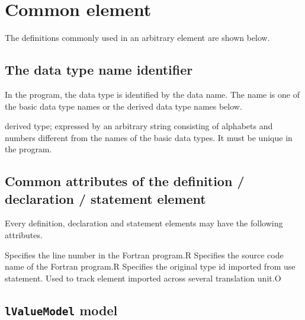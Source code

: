 \section{Common element}

The definitions commonly used in an arbitrary element are shown below.

\subsection{The data type name identifier}
\label{sec:Thedatatypenameidentifier}

In the program, the data type is identified by the data name.
The name is one of the basic data type names or the derived data type names below.
\newline

\begin{XcodeMLDataTypeNames}
{derived type; expressed by an arbitrary string consisting of alphabets and numbers
 different from the names of the basic data types. It must be unique in the program.}
\end{XcodeMLDataTypeNames}


\subsection{Common attributes of the definition / declaration / statement element}
\label{sec:Commonattributesofdefinition}

Every definition, declaration and statement elements may have the following attributes.

\begin{XcodeMLAttributes}
{Specifies the line number in the Fortran program.}{R}
{Specifies the source code name of the Fortran program.}{R}
{Specifies the original type id imported from use statement. Used to track element imported 
across several translation unit.}{O}
\end{XcodeMLAttributes}


\subsection{ {\tt lValueModel} model}
\label{sec:lValueModel}

